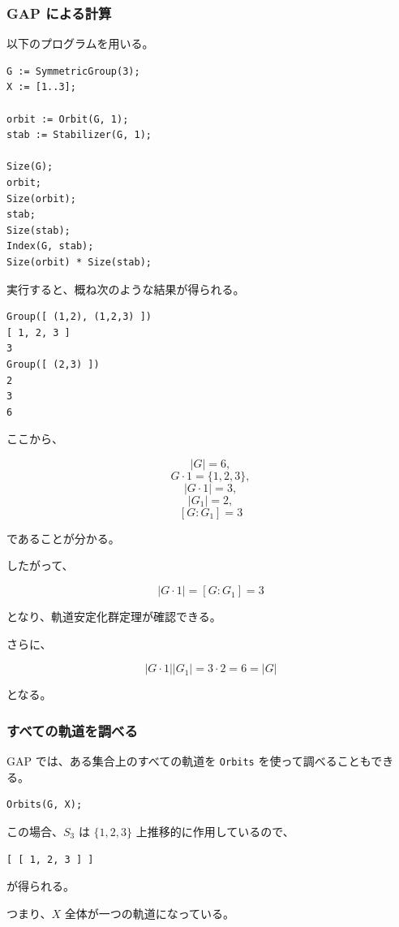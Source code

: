 \subsubsection{GAP による計算}

以下のプログラムを用いる。

\begin{lstlisting}[language={}]
G := SymmetricGroup(3);
X := [1..3];

orbit := Orbit(G, 1);
stab := Stabilizer(G, 1);

Size(G);
orbit;
Size(orbit);
stab;
Size(stab);
Index(G, stab);
Size(orbit) * Size(stab);
\end{lstlisting}

実行すると、概ね次のような結果が得られる。

\begin{lstlisting}
Group([ (1,2), (1,2,3) ])
[ 1, 2, 3 ]
3
Group([ (2,3) ])
2
3
6
\end{lstlisting}

ここから、

\[
|G|=6,
\]
\[
G\cdot1=\{1,2,3\},
\]
\[
|G\cdot1|=3,
\]
\[
|G_1|=2,
\]
\[
[G:G_1]=3
\]

であることが分かる。

したがって、

\[
|G\cdot1|
=
[G:G_1]
=
3
\]

となり、軌道安定化群定理が確認できる。

さらに、

\[
|G\cdot1||G_1|
=
3\cdot2
=
6
=
|G|
\]

となる。

\subsubsection{すべての軌道を調べる}

GAP では、ある集合上のすべての軌道を
\verb|Orbits| を使って調べることもできる。

\begin{lstlisting}[language={}]
Orbits(G, X);
\end{lstlisting}

この場合、$S_3$ は $\{1,2,3\}$ 上推移的に作用しているので、

\begin{lstlisting}
[ [ 1, 2, 3 ] ]
\end{lstlisting}

が得られる。

つまり、$X$ 全体が一つの軌道になっている。

